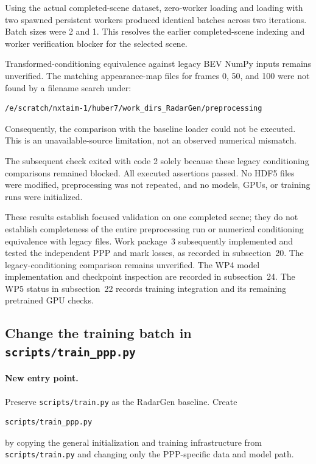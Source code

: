 \documentclass[11pt,a4paper]{article}
\begin{document}
Using the actual completed-scene dataset, zero-worker loading
and loading with two spawned persistent workers produced identical
batches across two iterations.
Batch sizes were 2 and 1.
This resolves the earlier completed-scene indexing and worker
verification blocker for the selected scene.

Transformed-conditioning equivalence against legacy BEV NumPy
inputs remains unverified.
The matching appearance-map files for frames 0, 50, and 100 were
not found by a filename search under:
\begin{lstlisting}
/e/scratch/nxtaim-1/huber7/work_dirs_RadarGen/preprocessing
\end{lstlisting}
Consequently, the comparison with the baseline loader could not
be executed. This is an unavailable-source limitation, not an
observed numerical mismatch.

The subsequent check exited with code 2 solely because these legacy
conditioning comparisons remained blocked.
All executed assertions passed.
No HDF5 files were modified, preprocessing was not repeated,
and no models, GPUs, or training runs were initialized.

These results establish focused validation on one completed scene;
they do not establish completeness of the entire preprocessing run
or numerical conditioning equivalence with legacy files.
Work package~3 subsequently implemented and tested the independent
PPP and mark losses, as recorded in subsection~20.
The legacy-conditioning comparison remains unverified.
The WP4 model implementation and checkpoint inspection are recorded in
subsection~24. The WP5 status in subsection~22 records training integration
and its remaining pretrained GPU checks.

\subsection{Change the training batch in \texttt{scripts/train\_ppp.py}}

\paragraph{New entry point.}
Preserve \texttt{scripts/train.py} as the RadarGen baseline. Create
\begin{lstlisting}
scripts/train_ppp.py
\end{lstlisting}
by copying the general initialization and training infrastructure from \texttt{scripts/train.py} and changing only the PPP-specific data and model path.
\end{document}
